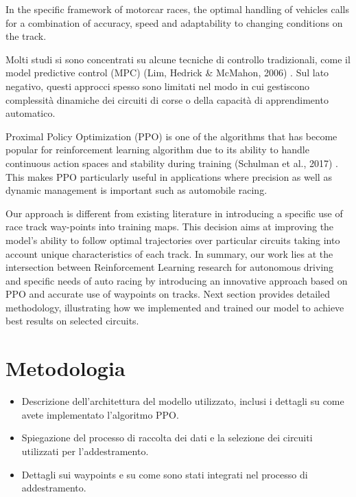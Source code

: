 \documentclass[conference]{IEEEtran}
\begin{document}
In the specific framework of motorcar races, the optimal handling of vehicles calls for a combination of accuracy, speed and adaptability to changing conditions on the track.

Molti studi si sono concentrati su alcune tecniche di controllo tradizionali, come il model predictive control (MPC) (Lim, Hedrick \& McMahon, 2006) \cite{second}. Sul lato negativo, questi approcci spesso sono limitati nel modo in cui gestiscono complessità dinamiche dei circuiti di corse o della capacità di apprendimento automatico.

Proximal Policy Optimization (PPO) is one of the algorithms that has become popular for reinforcement learning algorithm due to its ability to handle continuous action spaces and stability during training (Schulman et al., 2017) \cite{third}. This makes PPO particularly useful in applications where precision as well as dynamic management is important such as automobile racing.

Our approach is different from existing literature in introducing a specific use of race track way-points into training maps. This decision aims at improving the model’s ability to follow optimal trajectories over particular circuits taking into account unique characteristics of each track. In summary, our work lies at the intersection between Reinforcement Learning research for autonomous driving and specific needs of auto racing by introducing an innovative approach based on PPO and accurate use of waypoints on tracks. Next section provides detailed methodology, illustrating how we implemented and trained our model to achieve best results on selected circuits.


\section{Metodologia}

\begin{itemize}
    \item Descrizione dell'architettura del modello utilizzato, inclusi i dettagli su come avete implementato l'algoritmo PPO.

    \item Spiegazione del processo di raccolta dei dati e la selezione dei circuiti utilizzati per l'addestramento.

    \item Dettagli sui waypoints e su come sono stati integrati nel processo di addestramento.

\end{itemize}
\end{document}
